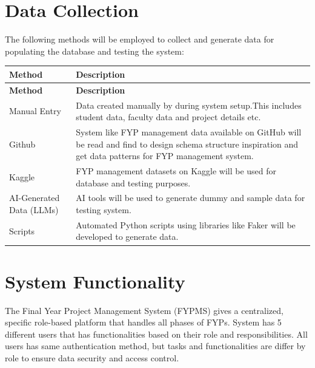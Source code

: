 \documentclass[12pt,a4paper]{report}
\begin{document}
\section{Data Collection}


The following methods will be employed to collect and generate data for populating the database and testing the system:

\vspace{6pt}
\begin{longtable}{|L{3.5cm}|p{10cm}|}
    \hline
    \textbf{Method} & \textbf{Description} \\
    \hline
    \endfirsthead
    \hline
    \textbf{Method} & \textbf{Description} \\
    \hline
    \endhead
    
    Manual Entry &
    Data created manually by  during system setup.This includes student data, faculty data and project details etc. \\
    \hline
    
   Github &
   System like FYP management data available on GitHub will be read and find to design schema 
    structure inspiration and get data patterns for FYP 
    management system. \\
    \hline
    
    Kaggle &
    FYP management datasets on Kaggle will be used for 
    database and testing purposes. \\
    \hline
    
    AI-Generated Data (LLMs) &
    AI tools will be used to generate dummy and sample data for testing system.\\
    \hline
    
    Scripts &
    Automated Python scripts using libraries like Faker will be developed to generate data. \\
    \hline
\end{longtable}

\section{System Functionality}

The Final Year Project Management System (FYPMS) gives a centralized, specific role-based 
platform that handles all phases of FYPs. System has 
5 different users that has functionalities based on their role and responsibilities. All users has same authentication method, but tasks and functionalities are differ by role to ensure data security and access control.
\end{document}
